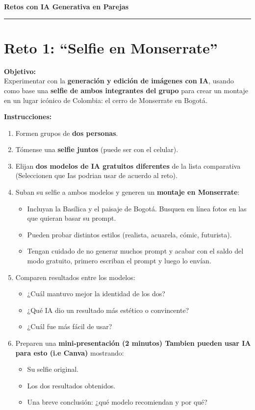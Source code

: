 \documentclass[12pt]{article}
\begin{document}
\begin{center}
    {\huge \textbf{Retos con IA Generativa en Parejas}} \\
    \vspace{0.3cm}
    \rule{\textwidth}{0.4pt}
\end{center}

\section*{Reto 1: ``Selfie en Monserrate''}

\textbf{Objetivo:} \\
Experimentar con la \textbf{generación y edición de imágenes con IA}, usando como base una \textbf{selfie de ambos integrantes del grupo} para crear un montaje en un lugar icónico de Colombia: el cerro de Monserrate en Bogotá.

\textbf{Instrucciones:}
\begin{enumerate}[label=\arabic*.]
    \item Formen grupos de \textbf{dos personas}.
    \item Tómense una \textbf{selfie juntos} (puede ser con el celular).
    \item Elijan \textbf{dos modelos de IA gratuitos diferentes} de la lista comparativa (Seleccionen que Ias podrian usar de acuerdo al reto).
    \item Suban su selfie a ambos modelos y generen un \textbf{montaje en Monserrate}:
    \begin{itemize}
        \item Incluyan la Basílica y el paisaje de Bogotá. Busquen en línea fotos en las que quieran basar su prompt.
        \item Pueden probar distintos estilos (realista, acuarela, cómic, futurista).
        \item Tengan cuidado de no generar muchos prompt y acabar con el saldo del modo gratuito, primero escriban el prompt y luego lo envían.
    \end{itemize}
    \item Comparen resultados entre los modelos:
    \begin{itemize}
        \item ¿Cuál mantuvo mejor la identidad de los dos?
        \item ¿Qué IA dio un resultado más estético o convincente?
        \item ¿Cuál fue más fácil de usar?
    \end{itemize}
    \item Preparen una \textbf{mini-presentación (2 minutos) Tambien pueden usar IA para esto (i.e Canva)} mostrando:
    \begin{itemize}
        \item Su selfie original.
        \item Los dos resultados obtenidos.
        \item Una breve conclusión: ¿qué modelo recomiendan y por qué?
    \end{itemize}
\end{enumerate}
\end{document}

